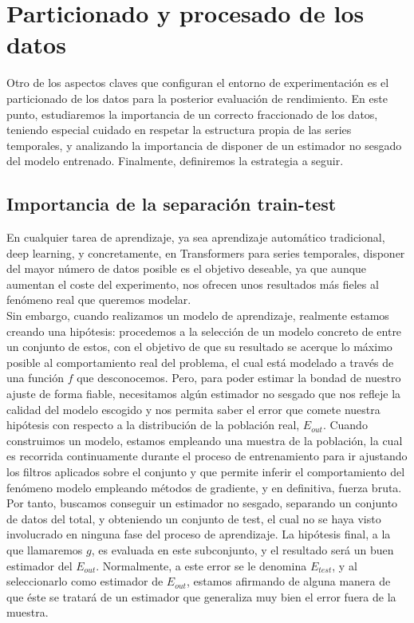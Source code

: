 \section{Particionado y procesado de los datos}

Otro de los aspectos claves que configuran el entorno de experimentación es el particionado de los datos para la posterior evaluación de rendimiento. En este punto, estudiaremos la importancia de un correcto fraccionado de los datos, teniendo especial cuidado en respetar la estructura propia de las series temporales, y analizando la importancia de disponer de un estimador no sesgado del modelo
entrenado. Finalmente, definiremos la estrategia a seguir.

\subsection{Importancia de la separación train-test}

En cualquier tarea de aprendizaje, ya sea aprendizaje automático tradicional, deep learning, y concretamente, en Transformers para series temporales, disponer del mayor número de datos posible es el objetivo deseable, ya que aunque aumentan el coste del experimento, nos ofrecen unos resultados más fieles al fenómeno real que queremos modelar.\\

Sin embargo, cuando realizamos un modelo de aprendizaje, realmente estamos creando una hipótesis: procedemos a la selección de un modelo concreto de entre un conjunto de estos, con el objetivo de que su resultado se acerque lo máximo posible al comportamiento real del problema, el cual está modelado a través de una función $f$ que desconocemos. Pero, para poder estimar la bondad de nuestro ajuste de forma fiable, necesitamos algún estimador no sesgado que nos refleje la calidad del modelo escogido y nos permita saber el error que comete nuestra hipótesis con respecto a la distribución de la población real, $E_{out}$. Cuando construimos un modelo, estamos empleando una muestra de la población, la cual es recorrida continuamente durante el proceso de entrenamiento para ir ajustando los filtros aplicados sobre el conjunto y que permite inferir el comportamiento del fenómeno modelo empleando métodos de gradiente, y en definitiva, fuerza bruta.\\

Por tanto, buscamos conseguir un estimador no sesgado, separando un conjunto de datos del total, y obteniendo un conjunto de test, el cual no se haya visto involucrado en ninguna fase del proceso de aprendizaje. La hipótesis final, a la que llamaremos $g$, es evaluada en este subconjunto, y el resultado será un buen estimador del $E_{out}$. Normalmente, a este error se le denomina $E_{test}$, y al seleccionarlo como estimador de $E_{out}$, estamos afirmando de alguna manera de que éste se tratará de un estimador que generaliza muy bien el error fuera de la muestra.\\

